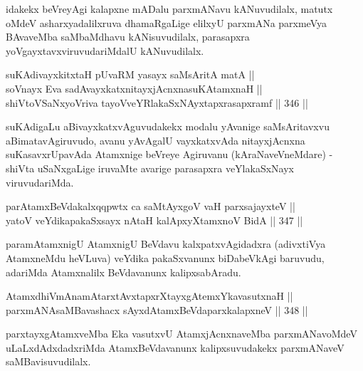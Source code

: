 \begin{artha}
idakekx beVreyAgi kalapxne mADalu parxmANavu kANuvudilalx, matutx oMdeV asharxyadalilxruva dhamaRgaLige elilxyU parxmANa parxmeVya BAvaveMba saMbaMdhavu kANisuvudilalx, parasapxra yoVgayxtavxviruvudariMdalU kANuvudilalx.
\end{artha}


\begin{shl}
suKAdivayxkitxtaH pUvaRM yasayx saMsAritA matA || \\
soV\s nayx Eva sadAvayxkatxnitayxjAcnxnasuKAtamxnaH || \\
shiVtoVSaNxyoVriva tayoVveYRlakaSxNAyxtapxrasapxramf ||  346 ||  
\end{shl}

\begin{artha}
suKAdigaLu aBivayxkatxvAguvudakekx modalu yAvanige saMsAritavxvu
aBimatavAgiruvudo, avanu yAvAgalU vayxkatxvAda nitayxjAcnxna
suKasavxrUpavAda Atamxnige beVreye Agiruvanu (kAraNaveVneMdare) -
shiVta uSaNxgaLige iruvaMte avarige parasapxra veYlakaSxNayx
viruvudariMda.
\end{artha}

\begin{shl}
parAtamxBeVdakalxqqpwtx ca saMtAyxgoV vaH parxsajayxteV || \\
yatoV veYdikapakaSxsayx nAtaH kalApxyX\s \s tamxnoV BidA ||  347 ||  
\end{shl}

\begin{artha}
paramAtamxnigU AtamxnigU BeVdavu kalxpatxvAgidadxra (adivxtiVya
AtamxneMdu heVLuva) veYdika pakaSxvanunx biDabeVkAgi baruvudu,
adariMda Atamxnalilx BeVdavanunx kalipxsabAradu.
\end{artha}


\begin{shl}
AtamxdhiVmAnamAtarxtAvxtapxrXtayxgAtemxYkavasutxnaH || \\
parxmANAsaMBavashacx sAyxdAtamxBeVdaparxkalapxneV ||  348 ||  
\end{shl}

\begin{artha}
parxtayxgAtamxveMba Eka vasutxvU AtamxjAcnxnaveMba parxmANavoMdeV
uLaLxdAdxdadxriMda AtamxBeVdavanunx kalipxsuvudakekx parxmANaveV
saMBavisuvudilalx.
\end{artha}

